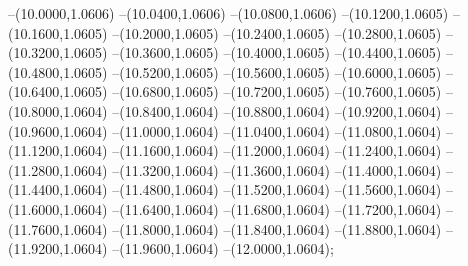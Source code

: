 {	--(10.0000,1.0606)
	--(10.0400,1.0606)
	--(10.0800,1.0606)
	--(10.1200,1.0605)
	--(10.1600,1.0605)
	--(10.2000,1.0605)
	--(10.2400,1.0605)
	--(10.2800,1.0605)
	--(10.3200,1.0605)
	--(10.3600,1.0605)
	--(10.4000,1.0605)
	--(10.4400,1.0605)
	--(10.4800,1.0605)
	--(10.5200,1.0605)
	--(10.5600,1.0605)
	--(10.6000,1.0605)
	--(10.6400,1.0605)
	--(10.6800,1.0605)
	--(10.7200,1.0605)
	--(10.7600,1.0605)
	--(10.8000,1.0604)
	--(10.8400,1.0604)
	--(10.8800,1.0604)
	--(10.9200,1.0604)
	--(10.9600,1.0604)
	--(11.0000,1.0604)
	--(11.0400,1.0604)
	--(11.0800,1.0604)
	--(11.1200,1.0604)
	--(11.1600,1.0604)
	--(11.2000,1.0604)
	--(11.2400,1.0604)
	--(11.2800,1.0604)
	--(11.3200,1.0604)
	--(11.3600,1.0604)
	--(11.4000,1.0604)
	--(11.4400,1.0604)
	--(11.4800,1.0604)
	--(11.5200,1.0604)
	--(11.5600,1.0604)
	--(11.6000,1.0604)
	--(11.6400,1.0604)
	--(11.6800,1.0604)
	--(11.7200,1.0604)
	--(11.7600,1.0604)
	--(11.8000,1.0604)
	--(11.8400,1.0604)
	--(11.8800,1.0604)
	--(11.9200,1.0604)
	--(11.9600,1.0604)
	--(12.0000,1.0604);
}
